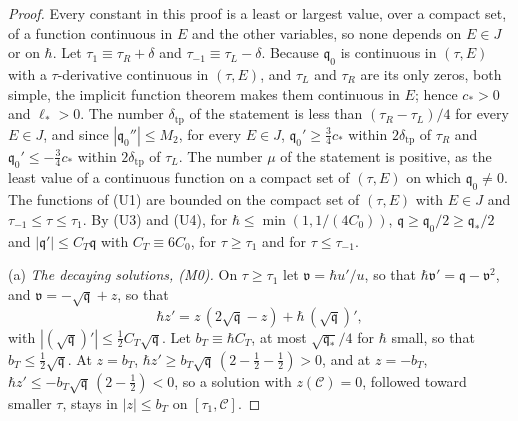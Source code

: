 \documentclass[aps,prd,onecolumn,tightenlines,nofootinbib,notitlepage,11pt,floatfix]{revtex4-2}
\theoremstyle{indentedtheorem}
\begin{document}
\begin{proof}
Every constant in this proof is a least or largest value, over a compact set, of a function continuous in $E$ and the other variables, so none depends on $E\in J$ or on $\hbar$. Let $\tau_1\equiv\tau_R+\delta$ and $\tau_{-1}\equiv\tau_L-\delta$. Because $\mathfrak{q}_0$ is continuous in $(\tau,E)$ with a $\tau$-derivative continuous in $(\tau,E)$, and $\tau_L$ and $\tau_R$ are its only zeros, both simple, the implicit function theorem makes them continuous in $E$; hence $c_*>0$ and $\ell_*>0$. The number $\delta_\text{tp}$ of the statement is less than $(\tau_R-\tau_L)/4$ for every $E\in J$, and since $|\mathfrak{q}_0''|\leq M_2$, for every $E\in J$, $\mathfrak{q}_0'\geq\tfrac{3}{4}c_*$ within $2\delta_\text{tp}$ of $\tau_R$ and $\mathfrak{q}_0'\leq-\tfrac{3}{4}c_*$ within $2\delta_\text{tp}$ of $\tau_L$. The number $\mu$ of the statement is positive, as the least value of a continuous function on a compact set of $(\tau,E)$ on which $\mathfrak{q}_0\neq0$. The functions of (U1) are bounded on the compact set of $(\tau,E)$ with $E\in J$ and $\tau_{-1}\leq\tau\leq\tau_1$. By (U3) and (U4), for $\hbar\leq\min(1,1/(4C_0))$, $\mathfrak{q}\geq\mathfrak{q}_0/2\geq\mathfrak{q}_*/2$ and $|\mathfrak{q}'|\leq C_T\mathfrak{q}$ with $C_T\equiv6C_0$, for $\tau\geq\tau_1$ and for $\tau\leq\tau_{-1}$.

(a) \emph{The decaying solutions, (M0).} On $\tau\geq\tau_1$ let $\mathfrak{v}=\hbar u'/u$, so that $\hbar\mathfrak{v}'=\mathfrak{q}-\mathfrak{v}^2$, and $\mathfrak{v}=-\sqrt{\mathfrak{q}}+z$, so that
\begin{equation*}
    \hbar z' = z\,(2\sqrt{\mathfrak{q}}-z)+\hbar\,(\sqrt{\mathfrak{q}})' ,
\end{equation*}
with $|(\sqrt{\mathfrak{q}})'|\leq\tfrac{1}{2}C_T\sqrt{\mathfrak{q}}$. Let $b_T\equiv\hbar C_T$, at most $\sqrt{\mathfrak{q}_*}/4$ for $\hbar$ small, so that $b_T\leq\tfrac{1}{2}\sqrt{\mathfrak{q}}$. At $z=b_T$, $\hbar z'\geq b_T\sqrt{\mathfrak{q}}\,(2-\tfrac{1}{2}-\tfrac{1}{2})>0$, and at $z=-b_T$, $\hbar z'\leq-b_T\sqrt{\mathfrak{q}}\,(2-\tfrac{1}{2})<0$, so a solution with $z(\mathcal{C})=0$, followed toward smaller $\tau$, stays in $|z|\leq b_T$ on $[\tau_1,\mathcal{C}]$.


\end{proof}
\end{document}
